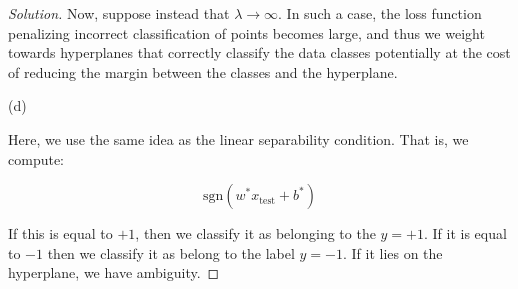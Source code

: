 \documentclass[10pt]{article}
\begin{document}
\begin{proof}[Solution]
Now, suppose instead that $\lambda \to \infty$. In such a case, the loss function penalizing incorrect classification of points becomes large, and thus we weight towards hyperplanes that correctly classify the data classes potentially at the cost of reducing the margin between the classes and the hyperplane.

(d)

Here, we use the same idea as the linear separability condition. That is, we compute:

$$ \text{sgn}( w^*x_{\text{test}} + b^*)$$

If this is equal to $+1$, then we classify it as belonging to the $y = +1$. If it is equal to $-1$ then we classify it as belong to the label $y = -1$. If it lies on the hyperplane, we have ambiguity.

\end{proof}
\end{document}
